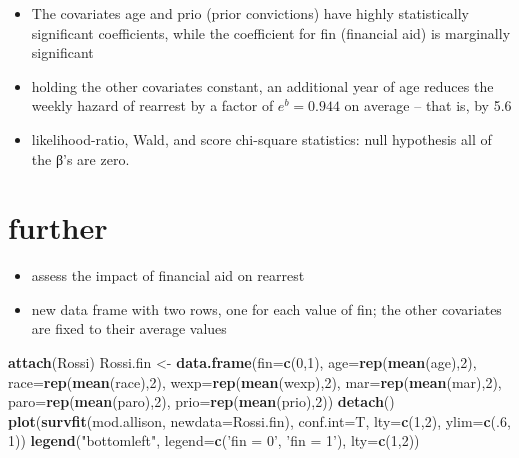 \documentclass[]{book}
\newenvironment{Shaded}{\begin{snugshade}}{\end{snugshade}}
\newcommand{\DataTypeTok}[1]{\textcolor[rgb]{0.13,0.29,0.53}{#1}}
\newcommand{\DecValTok}[1]{\textcolor[rgb]{0.00,0.00,0.81}{#1}}
\newcommand{\KeywordTok}[1]{\textcolor[rgb]{0.13,0.29,0.53}{\textbf{#1}}}
\newcommand{\NormalTok}[1]{#1}
\newcommand{\StringTok}[1]{\textcolor[rgb]{0.31,0.60,0.02}{#1}}
\providecommand{\tightlist}{%
  \setlength{\itemsep}{0pt}\setlength{\parskip}{0pt}}
\begin{document}
\begin{itemize}
\tightlist
\item
  The covariates age and prio (prior convictions) have highly statistically significant coefficients, while the coefficient for fin (financial aid) is marginally significant
\item
  holding the other covariates constant, an additional year of age reduces the weekly hazard of rearrest by a factor of \(e^b = 0.944\) on average -- that is, by 5.6
\item
  likelihood-ratio, Wald, and score chi-square statistics: null hypothesis all of the β's are zero.
\end{itemize}

\hypertarget{further}{%
\section{further}\label{further}}

\begin{itemize}
\tightlist
\item
  assess the impact of financial aid on rearrest
\item
  new data frame with two rows, one for each value of fin; the other covariates are fixed to their average values
\end{itemize}

\begin{Shaded}
\begin{Highlighting}[]
\KeywordTok{attach}\NormalTok{(Rossi)}
\NormalTok{Rossi.fin <-}\StringTok{ }\KeywordTok{data.frame}\NormalTok{(}\DataTypeTok{fin=}\KeywordTok{c}\NormalTok{(}\DecValTok{0}\NormalTok{,}\DecValTok{1}\NormalTok{), }\DataTypeTok{age=}\KeywordTok{rep}\NormalTok{(}\KeywordTok{mean}\NormalTok{(age),}\DecValTok{2}\NormalTok{), }\DataTypeTok{race=}\KeywordTok{rep}\NormalTok{(}\KeywordTok{mean}\NormalTok{(race),}\DecValTok{2}\NormalTok{), }\DataTypeTok{wexp=}\KeywordTok{rep}\NormalTok{(}\KeywordTok{mean}\NormalTok{(wexp),}\DecValTok{2}\NormalTok{), }\DataTypeTok{mar=}\KeywordTok{rep}\NormalTok{(}\KeywordTok{mean}\NormalTok{(mar),}\DecValTok{2}\NormalTok{), }\DataTypeTok{paro=}\KeywordTok{rep}\NormalTok{(}\KeywordTok{mean}\NormalTok{(paro),}\DecValTok{2}\NormalTok{), }\DataTypeTok{prio=}\KeywordTok{rep}\NormalTok{(}\KeywordTok{mean}\NormalTok{(prio),}\DecValTok{2}\NormalTok{))}
\KeywordTok{detach}\NormalTok{()}
\KeywordTok{plot}\NormalTok{(}\KeywordTok{survfit}\NormalTok{(mod.allison, }\DataTypeTok{newdata=}\NormalTok{Rossi.fin), }\DataTypeTok{conf.int=}\NormalTok{T, }\DataTypeTok{lty=}\KeywordTok{c}\NormalTok{(}\DecValTok{1}\NormalTok{,}\DecValTok{2}\NormalTok{), }\DataTypeTok{ylim=}\KeywordTok{c}\NormalTok{(.}\DecValTok{6}\NormalTok{, }\DecValTok{1}\NormalTok{))}
\KeywordTok{legend}\NormalTok{(}\StringTok{"bottomleft"}\NormalTok{, }\DataTypeTok{legend=}\KeywordTok{c}\NormalTok{(}\StringTok{'fin = 0'}\NormalTok{, }\StringTok{'fin = 1'}\NormalTok{), }\DataTypeTok{lty=}\KeywordTok{c}\NormalTok{(}\DecValTok{1}\NormalTok{,}\DecValTok{2}\NormalTok{))}
\end{Highlighting}
\end{Shaded}
\end{document}
